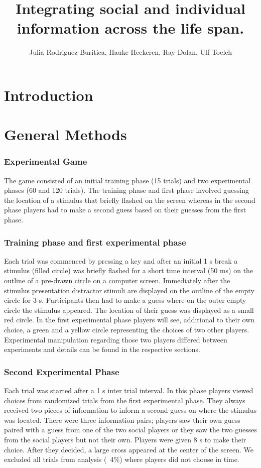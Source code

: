 \documentclass[man]{apa}
\title{Integrating social and individual information across the life span.}
\author{Julia Rodriguez-Buritica, Hauke Heekeren, Ray Dolan, Ulf Toelch}
\affiliation{Mind and Brain \\ Humboldt University}
\begin{document}
\maketitle
\section{Introduction}

\section{General Methods}
\subsubsection{Experimental Game}
The game consisted of an initial training phase (15 trials) and two experimental phases (60 and 120 trials). The training phase and first phase involved guessing the location of a stimulus that briefly flashed on the screen whereas in the second phase players had to make a second guess based on their guesses from the first phase. 

\subsubsection{Training phase and first experimental phase}
Each trial was commenced by pressing a key and after an initial 1 s break a stimulus (filled circle) was briefly flashed for a short time interval (50 ms) on the outline of a pre-drawn circle on a computer screen. Immediately after the stimulus presentation distractor stimuli are displayed on the outline of the empty circle for 3 s. Participants then had to make a guess where on the outer empty circle the stimulus appeared. The location of their guess was displayed as a small red circle. In the first experimental phase players will see, additional to their own choice, a green and a yellow circle representing the choices of two other players. Experimental manipulation regarding those two players differed between experiments and details can be found in the respective sections. 
\subsubsection{Second Experimental Phase}
Each trial was started after a 1 s inter trial interval. In this phase players viewed choices from randomized trials from the first experimental phase. They always received two pieces of information to inform a second guess on where the stimulus was located. There were three information pairs; players saw their own guess paired with a guess from one of the two social players or they saw the two guesses from the social players but not their own. Players were given 8 s to make their choice. After they decided, a large cross appeared at the center of the screen. We excluded all trials from analysis (~4\%)  where players did not choose in time.
\end{document}
